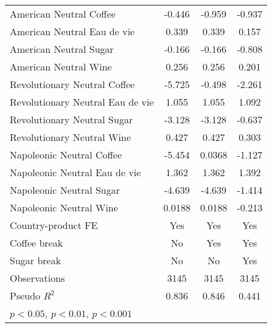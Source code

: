 \begin{table}[htbp]
\begin{tabular}{l*{3}{c}}
American Neutral Coffee&      -0.446\sym{*}  &      -0.959\sym{***}&      -0.937\sym{***}\\
American Neutral Eau de vie&       0.339         &       0.339         &       0.157         \\
American Neutral Sugar&      -0.166         &      -0.166         &      -0.808\sym{**} \\
American Neutral Wine&       0.256\sym{*}  &       0.256\sym{*}  &       0.201         \\
Revolutionary Neutral Coffee&      -5.725\sym{***}&      -0.498         &      -2.261         \\
Revolutionary Neutral Eau de vie&       1.055\sym{***}&       1.055\sym{***}&       1.092\sym{***}\\
Revolutionary Neutral Sugar&      -3.128\sym{***}&      -3.128\sym{***}&      -0.637         \\
Revolutionary Neutral Wine&       0.427\sym{**} &       0.427\sym{**} &       0.303\sym{*}  \\
Napoleonic Neutral Coffee&      -5.454\sym{***}&      0.0368         &      -1.127         \\
Napoleonic Neutral Eau de vie&       1.362\sym{***}&       1.362\sym{***}&       1.392\sym{***}\\
Napoleonic Neutral Sugar&      -4.639\sym{***}&      -4.639\sym{***}&      -1.414         \\
Napoleonic Neutral Wine&      0.0188         &      0.0188         &      -0.213         \\
Country-product FE  &         Yes         &         Yes         &         Yes         \\
Coffee break        &          No         &         Yes         &         Yes         \\
Sugar break         &          No         &          No         &         Yes         \\
\hline
Observations        &        3145         &        3145         &        3145         \\
Pseudo \(R^{2}\)    &       0.836         &       0.846         &       0.441         \\
\hline\hline
\multicolumn{4}{l}{\footnotesize \sym{*} \(p<0.05\), \sym{**} \(p<0.01\), \sym{***} \(p<0.001\)}\\
\end{tabular}
\end{table}

